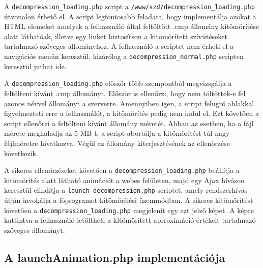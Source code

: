 \documentclass[oneside,titlepage,12pt,a4paper]{report}
\begin{document}
A \texttt{decompression\_loading.php} script a \texttt{/www/szd/decompression\_loading.php} útvonalon érhető el. A script legfontosabb feladata, hogy implementálja azokat a HTML elemeket amelyek a felhasználó által feltöltött .cmp állomány kitömörítése alatt láthatóak, illetve egy linket biztosítson a kitömörített szívütéseket tartalmazó szöveges állományhoz. A felhasználó a scriptet nem érheti el a navigációs menün keresztül, kizárólag a \texttt{decompression\_normal.php} scripten keresztül juthat ide. 
\par A \texttt{decompression\_loading.php} először több szempontból megvizsgálja a feltölteni kívánt .cmp állományt. Először is ellenőrzi, hogy nem töltöttek-e fel azonos névvel állományt a szerverre. Amennyiben igen, a script felugró ablakkal figyelmezteti erre a felhasználót, a kitömörítés pedig nem indul el. Ezt követően a script ellenőrzi a feltölteni kívánt állomány méretét. Abban az esetben, ha a fájl mérete meghaladja az 5 MB-t, a script abortálja a kitömörítést túl nagy fájlméretre hivatkozva. Végül az állomány kiterjesztésének az ellenőrzése következik.
\par A sikeres ellenőrzéseket követően a \texttt{decompression\_loading.php} beállítja a kitömörítés alatt látható animációt a webes felületen, majd egy Ajax híváson keresztül elindítja a \texttt{launch\_decompression.php} scriptet, amely rendszerhívás útján invokálja a főprogramot kitömörítési üzemmódban. A sikeres kitömörítést követően a \texttt{decompression\_loading.php} megjelenít egy ezt jelző képet. A képre kattintva a felhasználó letöltheti a kitömörített aprroximáció értékeit tartalmazó szöveges állományt. 

\subsection{A launchAnimation.php implementációja}
\end{document}
